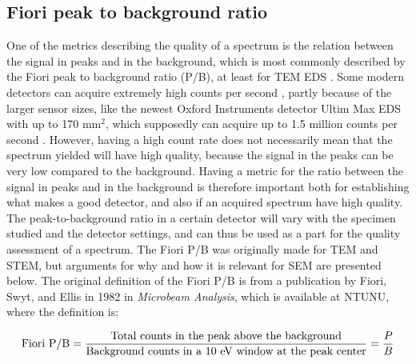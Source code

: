 \subsection{Fiori peak to background ratio}
\label{theory:qc:fiori}

One of the metrics describing the quality of a spectrum is the relation between the signal in peaks and in the background, which is most commonly described by the Fiori peak to background ratio (P/B), at least for TEM EDS \cite{carter2016transmission}.
Some modern detectors can acquire extremely high counts per second , partly because of the larger sensor sizes, like the newest Oxford Instruments detector Ultim Max EDS with up to 170 mm$^2$, which supposedly can acquire up to 1.5 million counts per second .
However, having a high count rate does not necessarily mean that the spectrum yielded will have high quality, because the signal in the peaks can be very low compared to the background.
Having a metric for the ratio between the signal in peaks and in the background is therefore important both for establishing what makes a good detector, and also if an acquired spectrum have high quality.
The peak-to-background ratio in a certain detector will vary with the specimen studied and the detector settings, and can thus be used as a part for the quality assessment of a spectrum.
The Fiori P/B was originally made for TEM and STEM, but arguments for why and how it is relevant for SEM are presented below.
The original definition of the Fiori P/B is from a publication by Fiori, Swyt, and Ellis in 1982 \cite{fiori_peak_background_1982} in \emph{Microbeam Analysis}, which is available at NTUNU, where the definition is:

\begin{equation}
    \label{eq:fiori_pb}
    \textnormal{Fiori P/B} = \frac{\textnormal{Total counts in the peak above the background}}{\textnormal{Background counts in a 10 eV window at the peak center}} = \frac{P}{B}
\end{equation}




